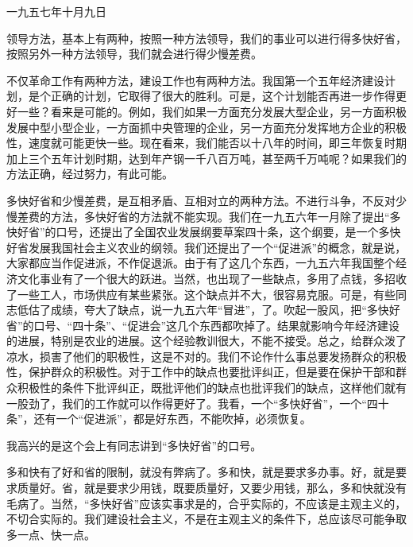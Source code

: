 一九五七年十月九日

领导方法，基本上有两种，按照一种方法领导，我们的事业可以进行得多快好省，按照另外一种方法领导，我们就会进行得少慢差费。

不仅革命工作有两种方法，建设工作也有两种方法。我国第一个五年经济建设计划，是个正确的计划，它取得了很大的胜利。可是，这个计划能否再进一步作得更好一些？看来是可能的。例如，我们如果一方面充分发展大型企业，另一方面积极发展中型小型企业，一方面抓中央管理的企业，另一方面充分发挥地方企业的积极性，速度就可能更快一些。现在看来，我们能否以十八年的时间，即三年恢复时期加上三个五年计划时期，达到年产钢一千八百万吨，甚至两千万吨呢？如果我们的方法正确，经过努力，有此可能。

多快好省和少慢差费，是互相矛盾、互相对立的两种方法。不进行斗争，不反对少慢差费的方法，多快好省的方法就不能实现。我们在一九五六年一月除了提出“多快好省”的口号，还提出了全国农业发展纲要草案四十条，这个纲要，是一个多快好省发展我国社会主义农业的纲领。我们还提出了一个“促进派”的概念，就是说，大家都应当作促进派，不作促退派。由于有了这几个东西，一九五六年我国整个经济文化事业有了一个很大的跃进。当然，也出现了一些缺点，多用了点钱，多招收了一些工人，市场供应有某些紧张。这个缺点并不大，很容易克服。可是，有些同志低估了成绩，夸大了缺点，说一九五六年“冒进”，了。吹起一股风，把“多快好省”的口号、“四十条”、“促进会”这几个东西都吹掉了。结果就影响今年经济建设的进展，特别是农业的进展。这个经验教训很大，不能不接受。总之，给群众泼了凉水，损害了他们的职极性，这是不对的。我们不论作什么事总要发扬群众的积极性，保护群众的积极性。对于工作中的缺点也要批评纠正，但是要在保护干部和群众积极性的条件下批评纠正，既批评他们的缺点也批评我们的缺点，这样他们就有一股劲了，我们的工作就可以作得更好了。我看，一个“多快好省”，一个“四十条”，还有一个“促进派”，都是好东西，不能吹掉，必须恢复。

我高兴的是这个会上有同志讲到“多快好省”的口号。

多和快有了好和省的限制，就没有弊病了。多和快，就是要求多办事。好，就是要求质量好。省，就是要求少用钱，既要质量好，又要少用钱，那么，多和快就没有毛病了。当然，“多快好省”应该实事求是的，合乎实际的，不应该是主观主义的，不切合实际的。我们建设社会主义，不是在主观主义的条件下，总应该尽可能争取多一点、快一点。



